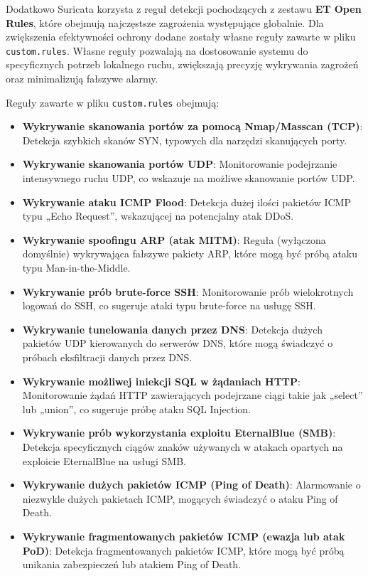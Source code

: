 \documentclass[
    left=2.5cm,         %
    right=2.5cm,        %
    top=2.5cm,          %
    bottom=3cm,         %
    bindingoffset=6mm,  %
    nohyphenation=true %
]{eiti/eiti-thesis} %
\begin{document}
Dodatkowo Suricata korzysta z reguł detekcji pochodzących z zestawu \textbf{ET Open Rules}, które obejmują najczęstsze zagrożenia występujące globalnie. Dla zwiększenia efektywności ochrony  dodane zostały własne reguły zawarte w pliku \texttt{custom.rules}\cite{custom-rules-github}. Własne reguły pozwalają na dostosowanie systemu do specyficznych potrzeb lokalnego ruchu, zwiększają precyzję wykrywania zagrożeń oraz minimalizują fałszywe alarmy.

Reguły zawarte w pliku \texttt{custom.rules} obejmują:

\begin{itemize}
\item \textbf{Wykrywanie skanowania portów za pomocą Nmap/Masscan (TCP)}: Detekcja szybkich skanów SYN, typowych dla narzędzi skanujących porty.
\item \textbf{Wykrywanie skanowania portów UDP}: Monitorowanie podejrzanie intensywnego ruchu UDP, co wskazuje na możliwe skanowanie portów UDP.

\item \textbf{Wykrywanie ataku ICMP Flood}: Detekcja dużej ilości pakietów ICMP typu „Echo Request”, wskazującej na potencjalny atak DDoS.

\item \textbf{Wykrywanie spoofingu ARP (atak MITM)}: Reguła (wyłączona domyślnie) wykrywająca fałszywe pakiety ARP, które mogą być próbą ataku typu Man-in-the-Middle.

\item \textbf{Wykrywanie prób brute-force SSH}: Monitorowanie prób wielokrotnych logowań do SSH, co sugeruje ataki typu brute-force na usługę SSH.

\item \textbf{Wykrywanie tunelowania danych przez DNS}: Detekcja dużych pakietów UDP kierowanych do serwerów DNS, które mogą świadczyć o próbach eksfiltracji danych przez DNS.

\item \textbf{Wykrywanie możliwej iniekcji SQL w żądaniach HTTP}: Monitorowanie żądań HTTP zawierających podejrzane ciągi takie jak „select” lub „union”, co sugeruje próbę ataku SQL Injection.

\item \textbf{Wykrywanie prób wykorzystania exploitu EternalBlue (SMB)}: Detekcja specyficznych ciągów znaków używanych w atakach opartych na exploicie EternalBlue na usługi SMB.

\item \textbf{Wykrywanie dużych pakietów ICMP (Ping of Death)}: Alarmowanie o niezwykle dużych pakietach ICMP, mogących świadczyć o ataku Ping of Death.

\item \textbf{Wykrywanie fragmentowanych pakietów ICMP (ewazja lub atak PoD)}: Detekcja fragmentowanych pakietów ICMP, które mogą być próbą unikania zabezpieczeń lub atakiem Ping of Death.
\end{itemize}
\end{document}
